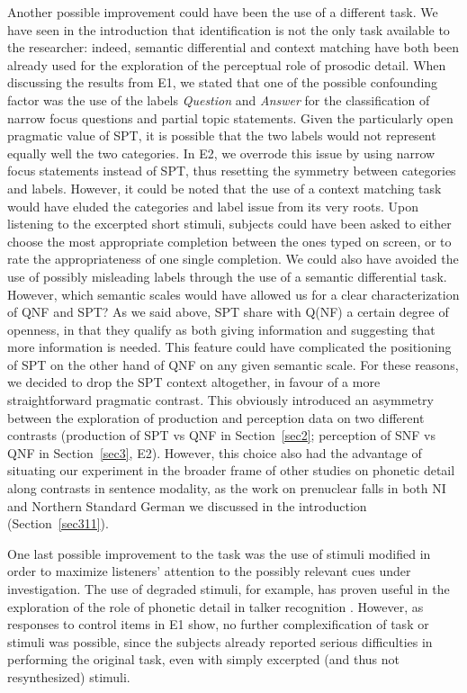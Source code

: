 Another possible improvement could have been the use of a different task. We have seen in the introduction that identification is not the only task available to the researcher: indeed, semantic differential and context matching have both been already used for the exploration of the perceptual role of prosodic detail. When discussing the results from E1, we stated that one of the possible confounding factor was the use of the labels \textit{Question} and \textit{Answer} for the classification of narrow focus questions and partial topic statements. Given the particularly open pragmatic value of SPT, it is possible that the two labels would not represent equally well the two categories. In E2, we overrode this issue by using narrow focus statements instead of SPT, thus resetting the symmetry between categories and labels. However, it could be noted that the use of a context matching task would have eluded the categories and label issue from its very roots. Upon listening to the excerpted short stimuli, subjects could have been asked to either choose the most appropriate completion between the ones typed on screen, or to rate the appropriateness of one single completion. We could also have avoided the use of possibly misleading labels through the use of a semantic differential task. However, which semantic scales would have allowed us for a clear characterization of QNF and SPT? As we said above, SPT share with Q(NF) a certain degree of openness, in that they qualify as both giving information and suggesting that more information is needed. This feature could have complicated the positioning of SPT on the other hand of QNF on any given semantic scale. For these reasons, we decided to drop the SPT context altogether, in favour of a more straightforward pragmatic contrast. This obviously introduced an asymmetry between the exploration of production and perception data on two different contrasts (production of SPT vs QNF in Section~\ref{sec2}; perception of SNF vs QNF in Section~\ref{sec3}, E2). However, this choice also had the advantage of situating our experiment in the broader frame of other studies on phonetic detail along contrasts in sentence modality, as the work on prenuclear falls in both NI and Northern Standard German we discussed in the introduction (Section~\ref{sec311}).

One last possible improvement to the task was the use of stimuli modified in order to maximize listeners' attention to the possibly relevant cues under investigation. The use of degraded stimuli, for example, has proven useful in the exploration of the role of phonetic detail in talker recognition \citep{sheffert2002learning}. However, as responses to control items in E1 show, no further complexification of task or stimuli was possible, since the subjects already reported serious difficulties in performing the original task, even with simply excerpted (and thus not resynthesized) stimuli.

